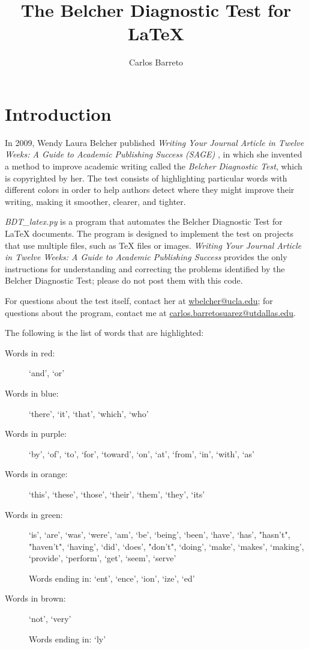 \documentclass[a4paper,10pt]{article}
\title{The Belcher Diagnostic Test for  \LaTeX}
\author{Carlos Barreto}
\newcommand{\BDTRed}[1]{{\color{red}#1}}
\newcommand{\BDTBlue}[1]{{\color{blue}#1}}
\newcommand{\BDTPurple}[1]{{\color{violet}#1}}
\newcommand{\BDTOrange}[1]{{\color{orange!50!yellow}#1}}
\newcommand{\BDTGreen}[1]{{\color{green}#1}}
\newcommand{\BDTBrown}[1]{{\color{brown!80!red}#1}}
\begin{document}
\maketitle



\section{Introduction}

In 2009, Wendy Laura Belcher published \emph{Writing Your Journal Article in Twelve Weeks: A Guide to Academic Publishing Success (SAGE)} \cite{belcher2009writing}, in which she invented a method to improve academic writing called the \emph{Belcher Diagnostic Test}, which is copyrighted by her. The test consists of highlighting particular words with different colors in order to help authors detect where they might improve their writing, making it smoother, clearer, and tighter. 

\emph{BDT\_latex.py} is a program that automates the Belcher Diagnostic Test for \LaTeX{} documents. The program is designed to implement the test on projects that use multiple files, such as \TeX{} files or images. 
%
\emph{Writing Your Journal Article in Twelve Weeks: A Guide to Academic Publishing Success} provides the only instructions for understanding and correcting the problems identified by the Belcher Diagnostic Test; please do not post them with this code.

For questions about the test itself, contact her at \url{wbelcher@ucla.edu};
for questions about the program, contact me at \url{carlos.barretosuarez@utdallas.edu}.

The following is the list of words that are highlighted:
\begin{description}
 \item[Words in \BDTRed{red}:]  `and', `or'
 \item[Words in \BDTBlue{blue}:] `there', `it', `that', `which', `who'
 \item[Words in \BDTPurple{purple}:] `by', `of', `to', `for', `toward', `on', `at', `from', `in', `with', `as'
 \item[Words in \BDTOrange{orange}:] `this', `these', `those', `their', `them', `they', `its'
 \item[Words in \BDTGreen{green}:] `is', `are', `was', `were', `am', `be', `being', `been', `have', `has', "hasn't", "haven't", `having', `did', `does', "don't", `doing', `make', `makes', `making', `provide', `perform', `get', `seem', `serve'
 
 Words ending in: `ent', `ence', `ion', `ize', `ed'
 
 \item[Words in \BDTBrown{brown}:] `not', `very'

 Words ending in: `ly'
\end{description}
\end{document}
